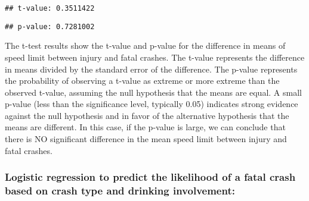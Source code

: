 \documentclass[
]{article}
\newenvironment{Shaded}{\begin{snugshade}}{\end{snugshade}}
\newcommand{\FunctionTok}[1]{\textcolor[rgb]{0.00,0.00,0.00}{#1}}
\newcommand{\NormalTok}[1]{#1}
\newcommand{\SpecialCharTok}[1]{\textcolor[rgb]{0.00,0.00,0.00}{#1}}
\newcommand{\StringTok}[1]{\textcolor[rgb]{0.31,0.60,0.02}{#1}}
\begin{document}
\begin{verbatim}
## t-value: 0.3511422
\end{verbatim}

\begin{Shaded}
\end{Shaded}

\begin{verbatim}
## p-value: 0.7281002
\end{verbatim}

The t-test results show the t-value and p-value for the difference in
means of speed limit between injury and fatal crashes. The t-value
represents the difference in means divided by the standard error of the
difference. The p-value represents the probability of observing a
t-value as extreme or more extreme than the observed t-value, assuming
the null hypothesis that the means are equal. A small p-value (less than
the significance level, typically 0.05) indicates strong evidence
against the null hypothesis and in favor of the alternative hypothesis
that the means are different. In this case, if the p-value is large, we
can conclude that there is NO significant difference in the mean speed
limit between injury and fatal crashes.

\hypertarget{logistic-regression-to-predict-the-likelihood-of-a-fatal-crash-based-on-crash-type-and-drinking-involvement}{%
\subsubsection{Logistic regression to predict the likelihood of a fatal
crash based on crash type and drinking
involvement:}\label{logistic-regression-to-predict-the-likelihood-of-a-fatal-crash-based-on-crash-type-and-drinking-involvement}}
\end{document}
